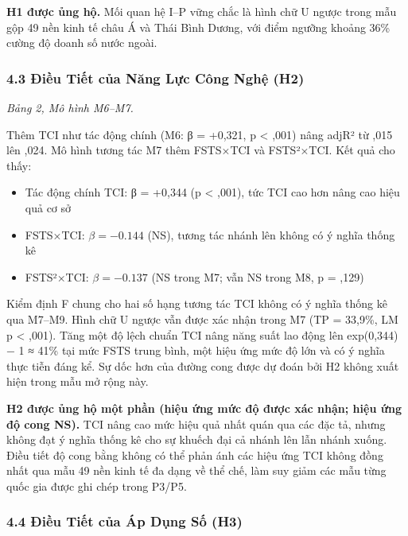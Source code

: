 \documentclass[12pt,a4paper]{article}
\providecommand{\tightlist}{\setlength{\itemsep}{0pt}\setlength{\parskip}{0pt}}
\begin{document}
\textbf{H1 được ủng hộ.} Mối quan hệ I--P vững chắc là hình chữ U ngược
trong mẫu gộp 49 nền kinh tế châu Á và Thái Bình Dương, với điểm ngưỡng
khoảng 36\% cường độ doanh số nước ngoài.

\hypertarget{43-ux111iux1ec1u-tiux1ebft-cux1ee7a-nux103ng-lux1ef1c-cuxf4ng-nghux1ec7-h2}{%
\subsubsection{4.3 Điều Tiết của Năng Lực Công Nghệ
(H2)}\label{43-ux111iux1ec1u-tiux1ebft-cux1ee7a-nux103ng-lux1ef1c-cuxf4ng-nghux1ec7-h2}}

\emph{Bảng 2, Mô hình M6--M7.}

Thêm TCI như tác động chính (M6: β = +0,321, p \textless{} ,001) nâng
adjR² từ ,015 lên ,024. Mô hình tương tác M7 thêm FSTS×TCI và FSTS²×TCI.
Kết quả cho thấy:

\begin{itemize}
\tightlist
\item
  Tác động chính TCI: β = +0,344 (p \textless{} ,001), tức TCI cao hơn
  nâng cao hiệu quả cơ sở
\item
  FSTS×TCI: \(\beta = −0.144\) (NS), tương tác nhánh lên không có ý
  nghĩa thống kê
\item
  FSTS²×TCI: \(\beta = −0.137\) (NS trong M7; vẫn NS trong M8, p = ,129)
\end{itemize}

Kiểm định F chung cho hai số hạng tương tác TCI không có ý nghĩa thống
kê qua M7--M9. Hình chữ U ngược vẫn được xác nhận trong M7 (TP = 33,9\%,
LM p \textless{} ,001). Tăng một độ lệch chuẩn TCI nâng năng suất lao
động lên exp(0,344) − 1 ≈ 41\% tại mức FSTS trung bình, một hiệu ứng mức
độ lớn và có ý nghĩa thực tiễn đáng kể. Sự dốc hơn của đường cong được
dự đoán bởi H2 không xuất hiện trong mẫu mở rộng này.

\textbf{H2 được ủng hộ một phần (hiệu ứng mức độ được xác nhận; hiệu ứng
độ cong NS).} TCI nâng cao mức hiệu quả nhất quán qua các đặc tả, nhưng
không đạt ý nghĩa thống kê cho sự khuếch đại cả nhánh lên lẫn nhánh
xuống. Điều tiết độ cong bằng không có thể phản ánh các hiệu ứng TCI
không đồng nhất qua mẫu 49 nền kinh tế đa dạng về thể chế, làm suy giảm
các mẫu từng quốc gia được ghi chép trong P3/P5.

\hypertarget{44-ux111iux1ec1u-tiux1ebft-cux1ee7a-uxe1p-dux1ee5ng-sux1ed1-h3}{%
\subsubsection{4.4 Điều Tiết của Áp Dụng Số
(H3)}\label{44-ux111iux1ec1u-tiux1ebft-cux1ee7a-uxe1p-dux1ee5ng-sux1ed1-h3}}
\end{document}

